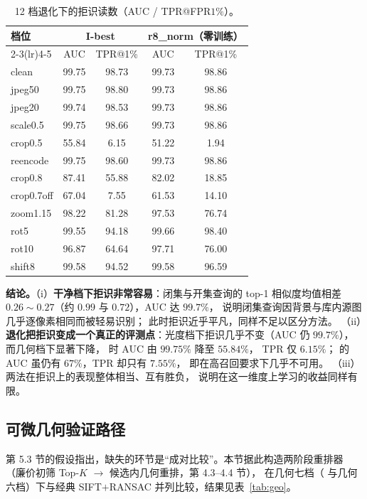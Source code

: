 \begin{table}[t]
\centering
\caption{12 档退化下的拒识读数（AUC / TPR@FPR$1\%$）。}
\label{tab:openset-deg}
\small
\begin{tabular}{lcccc}
\toprule
\multirow{2}{*}{档位} & \multicolumn{2}{c}{I-best} & \multicolumn{2}{c}{r8\_norm（零训练）} \\
\cmidrule(lr){2-3}\cmidrule(lr){4-5}
 & AUC & TPR@1\% & AUC & TPR@1\% \\
\midrule
clean      & 99.75 & 98.73 & 99.73 & 98.86 \\
jpeg50     & 99.75 & 98.80 & 99.73 & 98.86 \\
jpeg20     & 99.74 & 98.53 & 99.73 & 98.86 \\
scale0.5   & 99.75 & 98.66 & 99.73 & 98.86 \\
crop0.5    & 55.84 & 6.15  & 51.22 & 1.94 \\
reencode   & 99.75 & 98.60 & 99.73 & 98.86 \\
\midrule
crop0.8    & 87.41 & 55.88 & 82.02 & 18.85 \\
crop0.7off & 67.04 & 7.55  & 61.53 & 14.10 \\
zoom1.15   & 98.22 & 81.28 & 97.53 & 76.74 \\
rot5       & 99.55 & 94.18 & 99.66 & 98.40 \\
rot10      & 96.87 & 64.64 & 97.71 & 76.00 \\
shift8     & 99.58 & 94.52 & 99.58 & 96.59 \\
\bottomrule
\end{tabular}
\end{table}

\textbf{结论。}（i）\textbf{干净档下拒识非常容易}：闭集与开集查询的 top-1 相似度均值相差
$0.26\sim0.27$（约 $0.99$ 与 $0.72$），AUC 达 $99.7\%$，
说明闭集查询因背景与库内源图几乎逐像素相同而被轻易识别；
此时拒识近乎平凡，同样不足以区分方法。
（ii）\textbf{退化把拒识变成一个真正的评测点}：光度档下拒识几乎不变（AUC 仍 $99.7\%$），
而几何档下显著下降， 时 AUC 由 $99.75\%$ 降至 $55.84\%$，
TPR 仅 $6.15\%$； 的 AUC 虽仍有 $67\%$，TPR 却只有 $7.55\%$，
即在高召回要求下几乎不可用。
（iii）两法在拒识上的表现整体相当、互有胜负，
说明在这一维度上学习的收益同样有限。

\subsection{可微几何验证路径}
\label{sec:geo-exp}

第 5.3 节的假设指出，缺失的环节是“成对比较”。本节据此构造两阶段重排器
（廉价初筛 Top-$K$ $\rightarrow$ 候选内几何重排，第 4.3--4.4 节），
在几何七档（ 与几何六档）下与经典 SIFT$+$RANSAC 并列比较，结果见表~\ref{tab:geo}。

